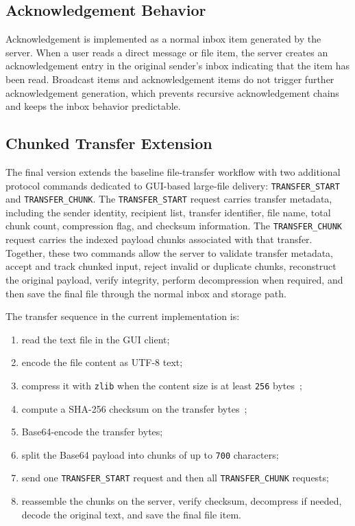 \documentclass[conference]{IEEEtran}
\begin{document}
\subsection{Acknowledgement Behavior}
Acknowledgement is implemented as a normal inbox item generated by the server. When a user reads a direct message or file item, the server creates an acknowledgement entry in the original sender's inbox indicating that the item has been read. Broadcast items and acknowledgement items do not trigger further acknowledgement generation, which prevents recursive acknowledgement chains and keeps the inbox behavior predictable.

\subsection{Chunked Transfer Extension}
The final version extends the baseline file-transfer workflow with two additional protocol commands dedicated to GUI-based large-file delivery: \texttt{TRANSFER\_START} and \texttt{TRANSFER\_CHUNK}. The \texttt{TRANSFER\_START} request carries transfer metadata, including the sender identity, recipient list, transfer identifier, file name, total chunk count, compression flag, and checksum information. The \texttt{TRANSFER\_CHUNK} request carries the indexed payload chunks associated with that transfer. Together, these two commands allow the server to validate transfer metadata, accept and track chunked input, reject invalid or duplicate chunks, reconstruct the original payload, verify integrity, perform decompression when required, and then save the final file through the normal inbox and storage path.


The transfer sequence in the current implementation is:
\begin{enumerate}
\item read the text file in the GUI client;
\item encode the file content as UTF-8 text;
\item compress it with \texttt{zlib} when the content size is at least \texttt{256} bytes~\cite{python_zlib};
\item compute a SHA-256 checksum on the transfer bytes~\cite{python_hashlib};
\item Base64-encode the transfer bytes;
\item split the Base64 payload into chunks of up to \texttt{700} characters;
\item send one \texttt{TRANSFER\_START} request and then all \texttt{TRANSFER\_CHUNK} requests;
\item reassemble the chunks on the server, verify checksum, decompress if needed, decode the original text, and save the final file item.
\end{enumerate}
\end{document}
